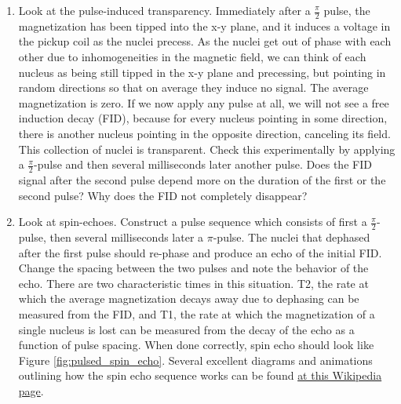 \documentclass{../lab}
\begin{document}
\begin{enumerate}
\begin{enumerate}
        \item Look at the pulse-induced transparency. Immediately after a $\frac{\pi}{2}$ pulse, the magnetization has been tipped into the x-y plane, and it induces a voltage in the pickup coil as the nuclei precess. As the nuclei get out of phase with each other due to inhomogeneities in the magnetic field, we can think of each nucleus as being still tipped in the x-y plane and precessing, but pointing in random directions so that on average they induce no signal. The average magnetization is zero. If we now apply any pulse at all, we will not see a free induction decay (FID), because for every nucleus pointing in some direction, there is another nucleus pointing in the opposite direction, canceling its field. This collection of nuclei is transparent. Check this experimentally by applying a $\frac{\pi}{2}$-pulse and then several milliseconds later another pulse. Does the FID signal after the second pulse depend more on the duration of the first or the second pulse? Why does the FID not completely disappear?
        \item Look at spin-echoes. Construct a pulse sequence which consists of first a $\frac{\pi}{2}$-pulse, then several milliseconds later a $\pi$-pulse. The nuclei that dephased after the first pulse should re-phase and produce an echo of the initial FID. Change the spacing between the two pulses and note the behavior of the echo. There are two characteristic times in this situation. T2, the rate at which the average magnetization decays away due to dephasing can be measured from the FID, and T1, the rate at which the magnetization of a single nucleus is lost can be measured from the decay of the echo as a function of pulse spacing. When done correctly, spin echo should look like Figure \ref{fig:pulsed_spin_echo}. Several excellent diagrams and animations outlining how the spin echo sequence works can be found \href{https://en.wikipedia.org/wiki/Spin_echo}{at this Wikipedia page}.
    \end{enumerate}


\end{enumerate}
\end{document}
